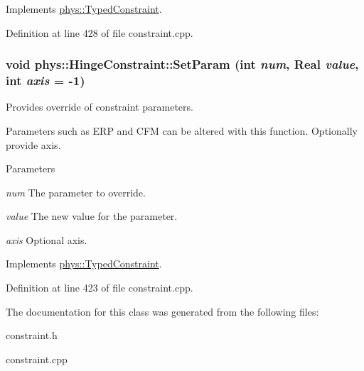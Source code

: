 Implements \hyperlink{classphys_1_1TypedConstraint_ab6140d40e9476c3dc46e2802e8097421}{phys::TypedConstraint}.



Definition at line 428 of file constraint.cpp.

\hypertarget{classphys_1_1HingeConstraint_adec79d062d67532e3521eaae6b49f877}{
\subsubsection[{SetParam}]{\setlength{\rightskip}{0pt plus 5cm}void phys::HingeConstraint::SetParam (int {\em num}, \/  {\bf Real} {\em value}, \/  int {\em axis} = {\ttfamily -\/1})}}
\label{d3/d0d/classphys_1_1HingeConstraint_adec79d062d67532e3521eaae6b49f877}


Provides override of constraint parameters. 

Parameters such as ERP and CFM can be altered with this function. Optionally provide axis. 
\begin{DoxyParams}{Parameters}
\item[{\em num}]The parameter to override. \item[{\em value}]The new value for the parameter. \item[{\em axis}]Optional axis. \end{DoxyParams}


Implements \hyperlink{classphys_1_1TypedConstraint_a31a20a74094f0cb8e4f82d1f99725415}{phys::TypedConstraint}.



Definition at line 423 of file constraint.cpp.



The documentation for this class was generated from the following files:\begin{DoxyCompactItemize}
\item 
constraint.h\item 
constraint.cpp\end{DoxyCompactItemize}
